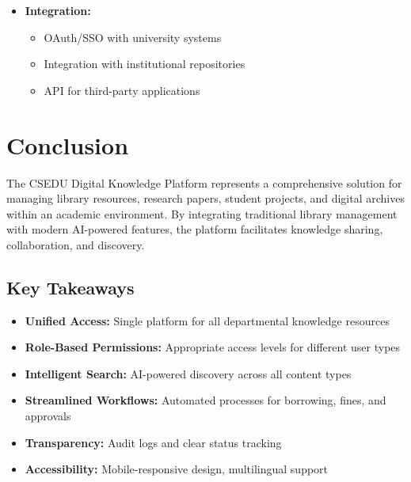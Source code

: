 \documentclass[12pt,a4paper]{article}
\begin{document}
\begin{itemize}[leftmargin=*]
\begin{itemize}
            \item Push notifications
            \item Barcode scanning for checkouts
        \end{itemize}
    \item \textbf{Integration:}
        \begin{itemize}
            \item OAuth/SSO with university systems
            \item Integration with institutional repositories
            \item API for third-party applications
        \end{itemize}
\end{itemize}

\newpage

\section{Conclusion}

The CSEDU Digital Knowledge Platform represents a comprehensive solution for managing library resources, research papers, student projects, and digital archives within an academic environment. By integrating traditional library management with modern AI-powered features, the platform facilitates knowledge sharing, collaboration, and discovery.

\subsection{Key Takeaways}

\begin{itemize}[leftmargin=*]
    \item \textbf{Unified Access:} Single platform for all departmental knowledge resources
    \item \textbf{Role-Based Permissions:} Appropriate access levels for different user types
    \item \textbf{Intelligent Search:} AI-powered discovery across all content types
    \item \textbf{Streamlined Workflows:} Automated processes for borrowing, fines, and approvals
    \item \textbf{Transparency:} Audit logs and clear status tracking
    \item \textbf{Accessibility:} Mobile-responsive design, multilingual support
\end{itemize}
\end{document}
